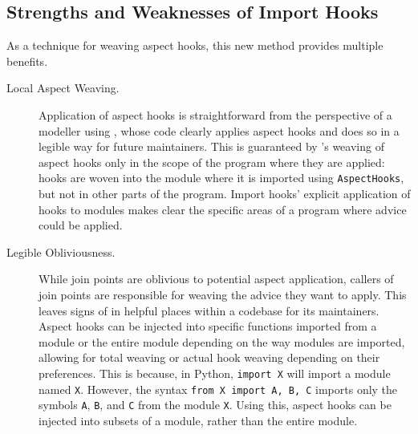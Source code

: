 \subsection{Strengths and Weaknesses of Import Hooks}\label{subsec:pdsf3importhooklimitations}

As a technique for weaving aspect hooks, this new method provides multiple
benefits.



\begin{description}
    \item[Local Aspect Weaving.] Application of aspect hooks is straightforward
        from the perspective of a modeller using \pdsfthree{}, whose code clearly
        applies aspect hooks and does so in a legible way for future
        maintainers. This is guaranteed by \pdsfthree{}'s weaving of aspect hooks
        only in the scope of the program where they are applied: hooks are woven
        into the module where it is imported using \lstinline{AspectHooks}, but
        not in other parts of the program. Import hooks' explicit application of
        hooks to modules makes clear the specific areas of a program where
        advice could be applied.

    \item[Legible Obliviousness.] While join points are oblivious to potential
        aspect application, callers of join points are responsible for weaving
        the advice they want to apply. This leaves signs of \aspectorientation{}
        in helpful places within a codebase for its maintainers. Aspect hooks
        can be injected into specific functions imported from a module or the
        entire module depending on the way modules are imported, allowing for
        total weaving or actual hook weaving depending on their preferences.
        This is because, in Python, \lstinline{import X} will import a module
        named \lstinline{X}. However, the syntax \lstinline{from X import A, B, C} imports only
        the symbols \lstinline{A}, \lstinline{B}, and \lstinline{C} from the
        module \lstinline{X}. Using this, aspect hooks can be injected into
        subsets of a module, rather than the entire module.
        

\end{description}

